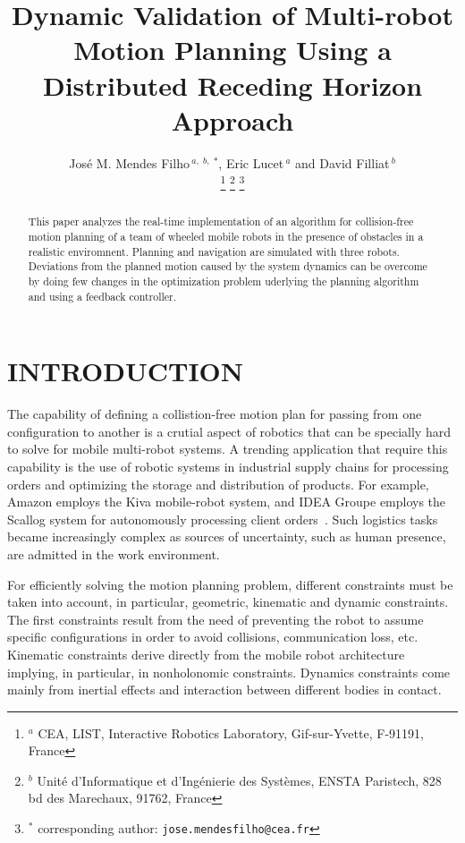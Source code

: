 \documentclass[letterpaper, 10 pt, conference]{ieeeconf}  %
\title{\LARGE \bf
Dynamic Validation of Multi-robot Motion Planning Using a Distributed Receding Horizon Approach
}
\author{Jos\'{e} M. Mendes Filho$\,^{a,}\,^{b,}\,^{*}$, Eric Lucet$\,^{a}$ and David Filliat$\,^{b}$\\%
\thanks{$^{a}$ CEA, LIST, Interactive Robotics Laboratory, Gif-sur-Yvette, F-91191, France}
\thanks{$^{b}$ Unit\'{e} d'Informatique et d'Ing\'{e}nierie des Syst\`{e}mes, ENSTA Paristech, 828 bd des Marechaux, 91762, France}
\thanks{$^{*}$ corresponding author: {\tt\small jose.mendesfilho@cea.fr}}
}
\begin{document}
\maketitle
\thispagestyle{empty}
\pagestyle{empty}


\begin{abstract}

This paper analyzes the real-time implementation of an algorithm for collision-free motion planning of a team of wheeled mobile robots in the presence of obstacles in a realistic enviromnent. Planning and navigation are simulated with three robots. Deviations from the planned motion caused by the system dynamics can be overcome by doing few changes in the optimization problem uderlying the planning algorithm and using a feedback controller.
\end{abstract}


\section{INTRODUCTION}


The capability of defining a collistion-free motion plan for passing from one configuration to another is a crutial aspect of robotics that can be specially hard to solve for mobile multi-robot systems. A trending application that require this capability is the use of robotic systems in industrial supply chains for processing orders and optimizing the storage and distribution of products. For example, Amazon employs the Kiva mobile-robot system, and IDEA Groupe employs the Scallog system for autonomously processing client orders~\cite{Gizmag,supplychain}. Such logistics tasks became increasingly complex as sources of uncertainty, such as human presence, are admitted in the work environment.


For efficiently solving the motion planning problem, different constraints must be taken into account, in particular, geometric, kinematic and dynamic constraints. The first constraints result from the need of preventing the robot to assume specific configurations in order to avoid collisions, communication loss, etc. Kinematic constraints derive directly from the mobile robot architecture implying, in particular, in nonholonomic constraints. Dynamics constraints come mainly from inertial effects and interaction between different bodies in contact.
\end{document}
